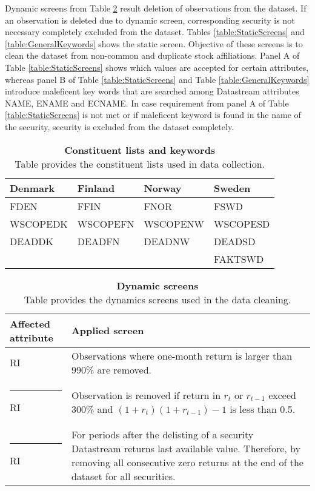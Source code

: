 \documentclass{article}
\begin{document}
Dynamic screens from Table \ref{table:DynamicScreens} result deletion of observations from the dataset. If an observation is deleted due to dynamic screen, corresponding security is not necessary completely excluded from the dataset. Tables \ref{table:StaticScreens} and \ref{table:GeneralKeywords} shows the static screen. Objective of these screens is to clean the dataset from non-common and duplicate stock affiliations. Panel A of Table \ref{table:StaticScreens} shows which values are accepted for certain attributes, whereas panel B of Table \ref{table:StaticScreens} and Table \ref{table:GeneralKeywords} introduce maleficent key words that are searched among Datastream attributes NAME, ENAME and ECNAME. In case requirement from panel A of Table \ref{table:StaticScreens} is not met or if maleficent keyword is found in the name of the security, security is excluded from the dataset completely. \par

\begin{table}[ht] 
\small
\caption[Constituent lists and keywords]{\textbf{Constituent lists and keywords}\\ Table provides the constituent lists used in data collection.}
 \label{table:constituteLists}
\centering
\begin{tabularx}{\textwidth}{X X X X}
\toprule
Denmark & Finland & Norway & Sweden \\
\midrule
FDEN 		&  FFIN		& FNOR		& FSWD\\
WSCOPEDK & WSCOPEFN & WSCOPENW& WSCOPESD\\
DEADDK 	&   DEADFN 	& DEADNW 	& DEADSD\\
& & & FAKTSWD\\
 \bottomrule
 \end{tabularx}
 \end{table} 
 
\begin{table}[ht] 
\small
\caption[Dynamic screens]{\textbf{Dynamic screens}\\ Table provides the dynamics screens used in the data cleaning.}
 \label{table:DynamicScreens}
\centering
\begin{tabularx}{\textwidth}{l X}
\toprule
Affected attribute & Applied screen \\
\midrule
RI 		& Observations where one-month return is larger than 990\% are removed.\\ \rule{-1ex}{3ex}
RI		& Observation is removed if return in $r_t$ or $r_{t-1}$ exceed 300\% and $(1+r_{t})(1+r_{t-1}) -1$ is less than 0.5. \\ \rule{-1ex}{3ex}
RI 		& For periods after the delisting of a security Datastream returns last available value. Therefore, by removing all consecutive zero returns at the end of the dataset for all securities.\\
 \bottomrule
 \end{tabularx}
 \end{table} 
\end{document}
